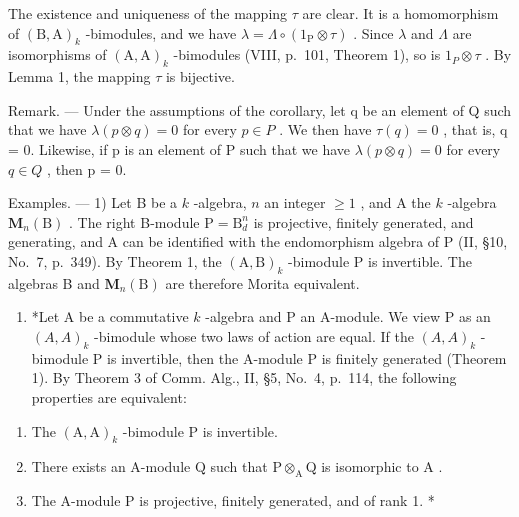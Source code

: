 The existence and uniqueness of the mapping \(\tau\) are clear. It is a homomorphism of \((\mathrm{B},\mathrm{A})_{k}\) -bimodules, and we have \(\lambda=\Lambda\circ(1_{\mathrm{P}}\otimes\tau)\) . Since \(\lambda\) and \(\Lambda\) are isomorphisms of \((\mathrm{A},\mathrm{A})_{k}\) -bimodules (VIII, p.~101, Theorem 1), so is \(1_{P}\otimes\tau\) . By Lemma 1, the mapping \(\tau\) is bijective.

Remark. --- Under the assumptions of the corollary, let q be an element of Q such that we have \(\lambda(p \otimes q) = 0\) for every \(p \in P\) . We then have \(\tau(q) = 0\) , that is, q = 0. Likewise, if p is an element of P such that we have \(\lambda(p \otimes q) = 0\) for every \(q \in Q\) , then p = 0.

Examples. --- 1) Let B be a \(k\) -algebra, \(n\) an integer \(\geqslant 1\) , and A the \(k\) -algebra \(\mathbf{M}_n(\mathrm{B})\) . The right B-module \(\mathrm{P} = \mathrm{B}_d^n\) is projective, finitely generated, and generating, and A can be identified with the endomorphism algebra of P (II, §10, No.~7, p.~349). By Theorem 1, the \((\mathrm{A},\mathrm{B})_k\) -bimodule P is invertible. The algebras B and \(\mathbf{M}_n(\mathrm{B})\) are therefore Morita equivalent.

\begin{enumerate}
\def\labelenumi{\arabic{enumi})}
\setcounter{enumi}{1}
\tightlist
\item
  *Let A be a commutative \(k\) -algebra and P an A-module. We view P as an \((A, A)_k\) -bimodule whose two laws of action are equal. If the \((A, A)_k\) -bimodule P is invertible, then the A-module P is finitely generated (Theorem 1). By Theorem 3 of Comm. Alg., II, §5, No.~4, p.~114, the following properties are equivalent:
\end{enumerate}

\begin{enumerate}
\def\labelenumi{(\roman{enumi})}
\item
  The \((\mathrm{A},\mathrm{A})_{k}\) -bimodule P is invertible.
\item
  There exists an A-module \(\mathrm{Q}\) such that \(\mathrm{P} \otimes_{\mathrm{A}} \mathrm{Q}\) is isomorphic to \(\mathrm{A}\) .
\item
  The A-module P is projective, finitely generated, and of rank 1. *
\end{enumerate}

